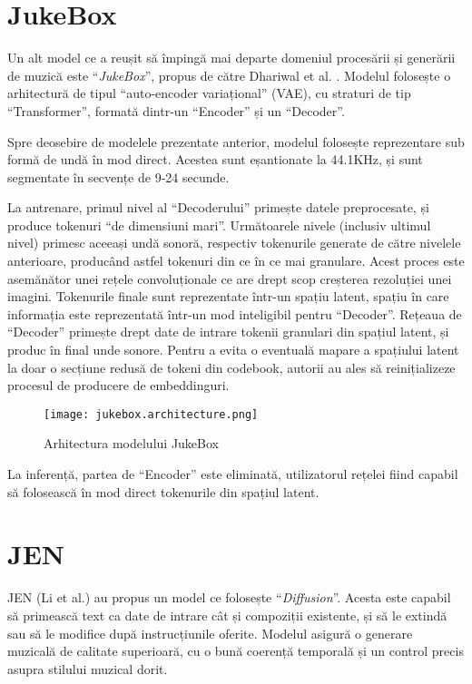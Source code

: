 \section{JukeBox}

Un alt model ce a reușit să împingă mai departe domeniul procesării și generării de muzică este ``\textit{JukeBox}'', propus de către Dhariwal et al. \cite{dhariwal2020jukeboxgenerativemodelmusic}. Modelul folosește o arhitectură de tipul ``auto-encoder variațional'' (VAE), cu straturi de tip ``Transformer'', formată dintr-un ``Encoder'' și un ``Decoder''.

Spre deosebire de modelele prezentate anterior, modelul folosește reprezentare sub formă de undă în mod direct. Acestea sunt eșantionate la 44.1KHz, și sunt segmentate în secvențe de 9-24 secunde.

La antrenare, primul nivel al ``Decoderului'' primește datele preprocesate, și produce tokenuri ``de dimensiuni mari''. Următoarele nivele (inclusiv ultimul nivel) primesc aceeași undă sonoră, respectiv tokenurile generate de către nivelele anterioare, producând astfel tokenuri din ce în ce mai granulare. Acest proces este asemănător unei rețele convoluționale ce are drept scop creșterea rezoluției unei imagini. Tokenurile finale sunt reprezentate într-un spațiu latent, spațiu în care informația este reprezentată într-un mod inteligibil pentru ``Decoder''. Rețeaua de ``Decoder'' primește drept date de intrare tokenii granulari din spațiul latent, și produc în final unde sonore. Pentru a evita o eventuală mapare a spațiului latent la doar o secțiune redusă de tokeni din codebook, autorii au ales să reinițializeze procesul de producere de embeddinguri.

\begin{figure}[H]
    \centering
    \texttt{[image: jukebox.architecture.png]}
    \caption{Arhitectura modelului JukeBox}
    \label{jukebox-architecture}
\end{figure}

La inferență, partea de ``Encoder'' este eliminată, utilizatorul rețelei fiind capabil să folosească în mod direct tokenurile din spațiul latent.

\section{JEN}

JEN (Li et al.) \cite{li2025jen1textguideduniversalmusic} au propus un model ce folosește ``\textit{Diffusion}''. Acesta este capabil să primească text ca date de intrare cât și compoziții existente, și să le extindă sau să le modifice după instrucțiunile oferite. Modelul asigură o generare muzicală de calitate superioară, cu o bună coerență temporală și un control precis asupra stilului muzical dorit.

